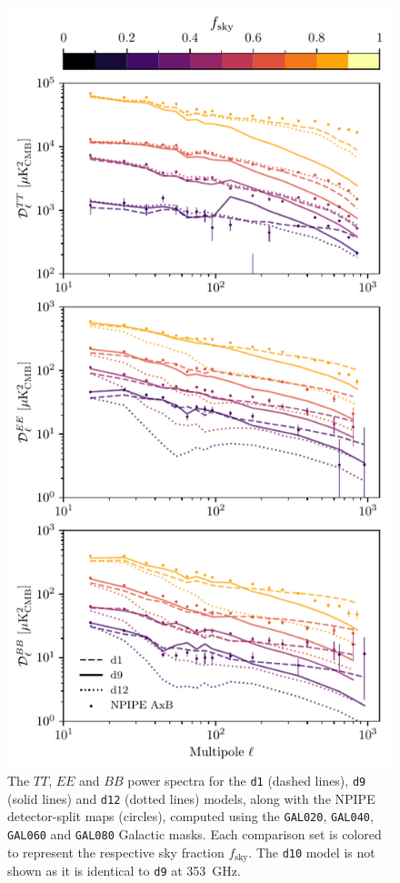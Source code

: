 \documentclass[twocolumn]{aastex631}
\begin{document}
\begin{figure}
    \centering
    \includegraphics[width=\columnwidth]{figures/largefield_power_all_TEB_pub.pdf}
    \caption{The $TT$, $EE$ and $BB$ power spectra for the \texttt{d1} (dashed lines), \texttt{d9} (solid lines) and \texttt{d12} (dotted lines) models, along with the NPIPE detector-split maps (circles), computed using the \texttt{GAL020}, \texttt{GAL040}, \texttt{GAL060} and \texttt{GAL080} Galactic masks. Each comparison set is colored to represent the respective sky fraction $f_{\mathrm{sky}}$. The \texttt{d10} model is not shown as it is identical to \texttt{d9} at 353~GHz.}
    \label{fig:largefield_power}
\end{figure}
\end{document}
